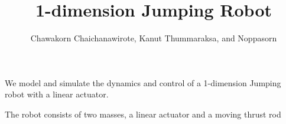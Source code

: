 \documentclass[12pt, a4paper]{report}
\title{1-dimension Jumping Robot}
\author{Chawakorn Chaichanawirote, Kanut Thummaraksa, and Noppasorn}
\begin{document}
\maketitle

We model and simulate the dynamics and control of a 1-dimension Jumping robot with a linear actuator.

\begin{section}[Design]
The robot consists of two masses, a linear actuator and a moving thrust rod
\end{section}
\end{document}
